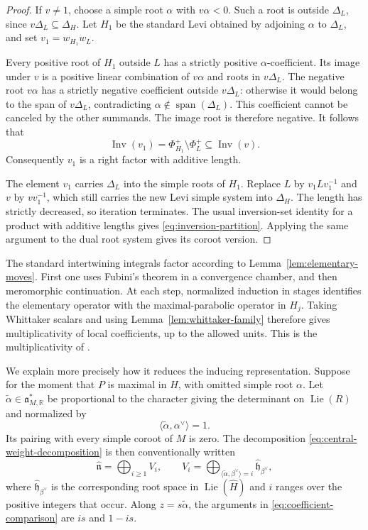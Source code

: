\begin{proof}
If $v\ne1$, choose a simple root $\alpha$ with $v\alpha<0$.
Such a root is outside $\Delta_L$, since $v\Delta_L\subseteq\Delta_H$.
Let $H_1$ be the standard Levi obtained by adjoining $\alpha$ to
$\Delta_L$, and set $v_1=w_{H_1}w_L$.

Every positive root of $H_1$ outside $L$ has a strictly positive
$\alpha$-coefficient.  Its image under $v$ is a positive linear
combination of $v\alpha$ and roots in $v\Delta_L$.  The negative root
$v\alpha$ has a strictly negative coefficient outside $v\Delta_L$:
otherwise it would belong to the span of $v\Delta_L$, contradicting
$\alpha\notin\operatorname{span}(\Delta_L)$.  This coefficient cannot
be canceled by the other summands.  The image root is therefore
negative.  It follows that
\[
 \operatorname{Inv}(v_1)
   =\Phi_{H_1}^+\setminus\Phi_L^+
   \subseteq\operatorname{Inv}(v).
\]
Consequently $v_1$ is a right factor with additive length.

The element $v_1$ carries $\Delta_L$ into the simple roots of $H_1$.
Replace $L$ by $v_1Lv_1^{-1}$ and $v$ by $vv_1^{-1}$, which still
carries the new Levi simple system into $\Delta_H$.  The length has
strictly decreased, so iteration terminates.  The usual inversion-set
identity for a product with additive lengths gives
\eqref{eq:inversion-partition}.  Applying the same argument to the dual
root system gives its coroot version.
\end{proof}

The standard intertwining integrals factor according to
Lemma~\ref{lem:elementary-moves}.  First one uses Fubini's theorem in
a convergence chamber, and then meromorphic continuation.  At each
step, normalized induction in stages identifies the elementary
operator with the maximal-parabolic operator in $H_j$.  Taking
Whittaker scalars and using Lemma~\ref{lem:whittaker-family} therefore
gives multiplicativity of local coefficients, up to the allowed
units.  This is the multiplicativity of
\cite[Proposition~2.3]{LomeliLS}.

We explain more precisely how it reduces the inducing representation.
Suppose for the moment that $P$ is maximal in $H$, with omitted simple
root $\alpha$.  Let $\widetilde\alpha\in\mathfrak a_{M,\mathbb R}^*$
be proportional to the character giving the determinant on
$\operatorname{Lie}(R)$ and normalized by
\[
 \langle\widetilde\alpha,\alpha^\vee\rangle=1.
\]
Its pairing with every simple coroot of $M$ is zero.  The decomposition
\eqref{eq:central-weight-decomposition} is then conventionally written
\[
 \widehat{\mathfrak n}=\bigoplus_{i\geq1}V_i,\qquad
 V_i=\bigoplus_{\langle\widetilde\alpha,\beta^\vee\rangle=i}
                       \widehat{\mathfrak h}_{\beta^\vee},
\]
where $\widehat{\mathfrak h}_{\beta^\vee}$ is the corresponding root
space in $\operatorname{Lie}(\widehat H)$ and $i$ ranges over the
positive integers that occur.  Along
$z=s\widetilde\alpha$, the arguments in
\eqref{eq:coefficient-comparison} are $is$ and $1-is$.

